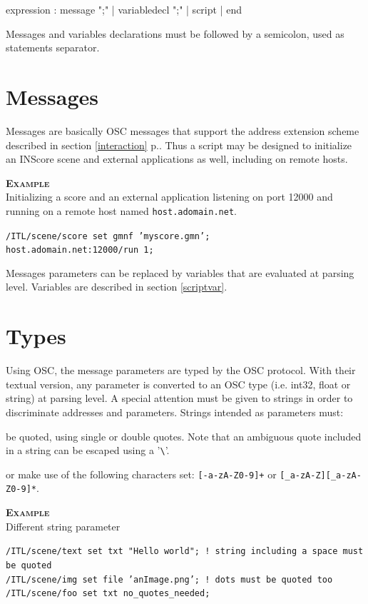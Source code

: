 \documentclass[a4paper,twoside]{report}
\newcommand{\sublevel}[1]	{\section{#1}}
\newcommand{\fullref}[1]	{\ref{#1} p.\pageref{#1}}
\newcommand{\OSC}[1]		{\texttt{#1}}
\newcommand{\example}		{\textbf{\hspace{-1.5cm}\textbf{\textsc{Example }}}}
\let\olditemize\itemize
\let\oldenditemize\enditemize
\renewenvironment{itemize} 	{\olditemize \setlength{\itemsep}{1mm}}{\oldenditemize}
\newcommand{\sample}	[1]			{\vspace{-2mm}\begin{center}\colorbox{mygrey}{
								\begin{minipage}[t]{0.9\columnwidth} 
								{\small \texttt{#1}}
								\end{minipage}}\end{center}}
\begin{document}
\begin{rail}
expression :  
		 	message ";"
		| 	variabledecl ";"
		| 	script
		|   end
\end{rail}

Messages and variables declarations must be followed by a semicolon, used as statements separator.

\sublevel{Messages}\label{scriptmsgs}

Messages are basically OSC messages that support the address extension scheme described in section \fullref{interaction}.
Thus a script may be designed to initialize an INScore scene and external applications as well, including on remote hosts.

\example\\
Initializing a score and an external application listening on port 12000 and running on a remote host named \OSC{host.adomain.net}.
\sample{/ITL/scene/score set gmnf 'myscore.gmn';\\
host.adomain.net:12000/run 1;
}

Messages parameters can be replaced by variables that are evaluated at parsing level. Variables are described in section \ref{scriptvar}.

\sublevel{Types}\label{scripttypes}

Using OSC, the message parameters are typed by the OSC protocol. 
With their textual version, any parameter is converted to an OSC type (i.e. int32, float or string) at parsing level.
A special attention must be given to strings in order to discriminate addresses and parameters. Strings intended as parameters must:
\begin{itemize}
\item be quoted, using single or double quotes. Note that an ambiguous quote included in a string can be escaped using a '\verb+\+'.
\item or make use of the following characters set: \OSC{[-a-zA-Z0-9]+} or \OSC{[\_a-zA-Z][\_a-zA-Z0-9]*}.
 \end{itemize}

\example \\
Different string parameter
\sample{/ITL/scene/text set txt "Hello world";  ! string including a space must be quoted \\
/ITL/scene/img set file 'anImage.png';  ! dots must be quoted too \\
/ITL/scene/foo set txt no\_quotes\_needed;
}
\end{document}
